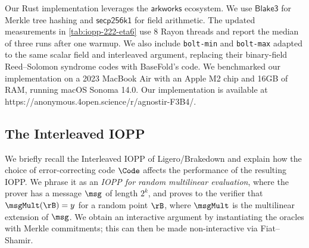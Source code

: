 Our Rust implementation leverages the $\mathsf{arkworks}$ \cite{arkworks} ecosystem.
We use $\mathsf{Blake3}$ for Merkle tree hashing and $\mathsf{secp256k1}$ for field arithmetic.
The updated measurements in \cref{tab:iopp-222-eta6} use 8 Rayon threads and report the median of three runs after one warmup.
We also include \texttt{bolt-min} and \texttt{bolt-max} adapted to the same scalar field and interleaved argument, replacing their binary-field Reed--Solomon syndrome codes with BaseFold's code.
We benchmarked our implementation on a 2023 MacBook Air with an Apple M2 chip and 16GB of RAM, running macOS Sonoma 14.0.
Our implementation is available at https://anonymous.4open.science/r/agnostir-F3B4/.

\subsection{The Interleaved IOPP}
\label{sec:eval-interleaved-iopp}

We briefly recall the Interleaved IOPP of Ligero/Brakedown and explain how the choice of error-correcting code $\Code$ affects the performance of the resulting IOPP.
We phrase it as an \emph{IOPP for random multilinear evaluation}, where the prover has a message $\msg$ of length $2^k$, and proves to the verifier that $\msgMult(\rB) = y$ for a random point $\rB$, where $\msgMult$ is the multilinear extension of $\msg$.
We obtain an interactive argument by instantiating the oracles with Merkle commitments; this can then be made non-interactive via Fiat--Shamir.

